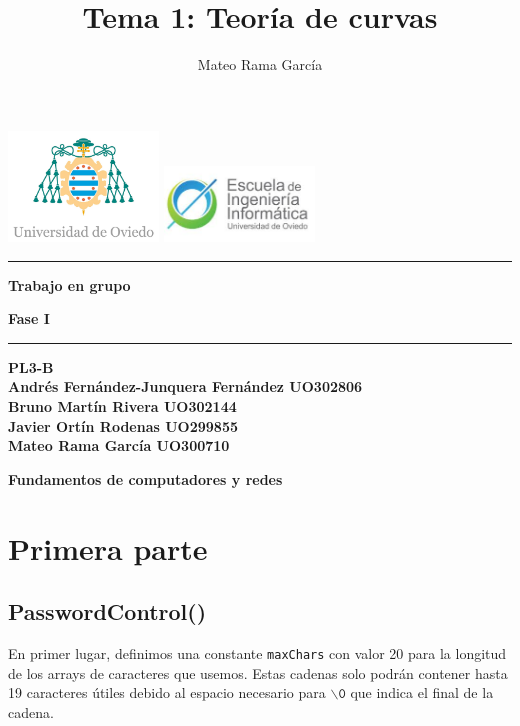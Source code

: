 \documentclass[11pt,a4paper]{article}
\title{\textbf{Tema 1: } Teoría de curvas}
\author{Mateo Rama García}
\begin{document}
  
\begin{titlepage}
  \centering  
  \vspace*{1cm}  %
  \includegraphics[width=0.3\textwidth]{uniovi.jpg} \hspace{2cm}
  \includegraphics[width=0.3\textwidth]{descarga.jpeg} \\[1cm] 
  \vspace{\fill}%
  \hrule
  \vspace{0.5cm}
  {\Huge \bfseries Trabajo en grupo\par}
  \vspace{0.5cm}
  {\Large \bfseries Fase I\par}
  \vspace{0.5cm}
  \hrule
  \vspace{1cm}
  {\bfseries PL3-B \\ [3ex]
  Andrés Fernández-Junquera Fernández UO302806\\[3ex]
  Bruno Martín Rivera UO302144\\[3ex]
  Javier Ortín Rodenas UO299855\\[3ex]
  Mateo Rama García UO300710\par} %
  \vspace{\fill}  %
  {\Large \textbf{Fundamentos de computadores y redes}\par}
\end{titlepage}



\newpage

\tableofcontents

\newpage


\section{Primera parte}
\subsection{PasswordControl()}
En primer lugar, definimos una constante \texttt{maxChars} con valor 20 para la longitud de los arrays de caracteres que usemos. Estas cadenas solo podrán contener hasta 19 caracteres útiles debido al espacio necesario para \(\backslash \texttt{0}\) que indica el final de la cadena.
\end{document}
